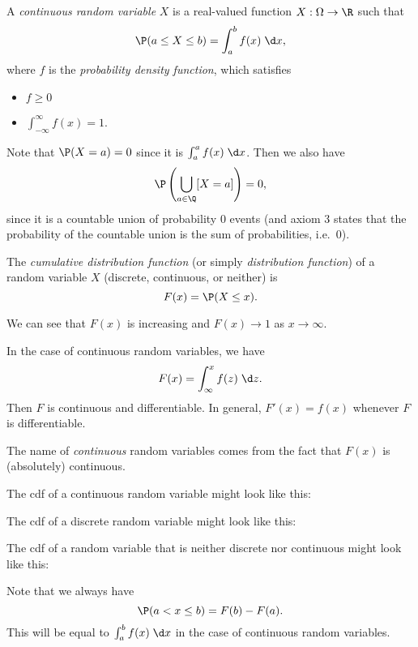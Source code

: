 \documentclass[a4paper]{article}
\begin{document}
\begin{defi}
  A \emph{continuous random variable} $X$ is a real-valued function $X: \Omega \to \R$ such that
  \[
    \P(a \leq X \leq b) = \int_a^b f(x) \;\d x,
  \]
  where $f$ is the \emph{probability density function}, which satisfies
  \begin{itemize}
    \item $f \geq 0$
    \item $\int_{-\infty}^\infty f(x) = 1$.
  \end{itemize}
\end{defi}
Note that $\P(X = a) = 0$ since it is $\int_a^a f(x)\;\d x$. Then we also have
\[
  \P\left(\bigcup_{a\in \Q} [X = a]\right) = 0,
\]
since it is a countable union of probability 0 events (and axiom 3 states that the probability of the countable union is the sum of probabilities, i.e.\ 0).

\begin{defi}
  The \emph{cumulative distribution function} (or simply \emph{distribution function}) of a random variable $X$ (discrete, continuous, or neither) is
  \[
    F(x) = \P(X \leq x).
  \]
\end{defi}
We can see that $F(x)$ is increasing and $F(x) \to 1$ as $x\to \infty$.

In the case of continuous random variables, we have
\[
  F(x) = \int_\infty^x f(z) \;\d z.
\]
Then $F$ is continuous and differentiable. In general, $F'(x) = f(x)$ whenever $F$ is differentiable.

The name of \emph{continuous} random variables comes from the fact that $F(x)$ is (absolutely) continuous.

The cdf of a continuous random variable might look like this:
\begin{center}
\end{center}
The cdf of a discrete random variable might look like this:
\begin{center}
\end{center}
The cdf of a random variable that is neither discrete nor continuous might look like this:
\begin{center}
\end{center}
Note that we always have
\[
  \P(a < x \leq b) = F(b) - F(a).
\]
This will be equal to $\int_a^b f(x)\;\d x$ in the case of continuous random variables.
\end{document}
